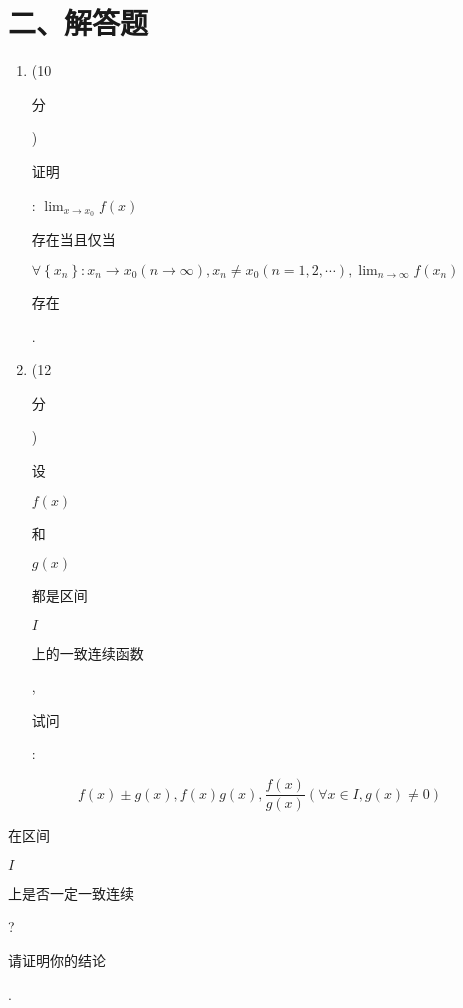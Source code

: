 \documentclass[10pt]{article}
\begin{document}
\section{二、解答题}
\begin{enumerate}
  \item (10 \begin{CJK}{UTF8}{mj}分\end{CJK}) \begin{CJK}{UTF8}{mj}证明\end{CJK}: $\lim _{x \rightarrow x_{0}} f(x)$ \begin{CJK}{UTF8}{mj}存在当且仅当\end{CJK} $\forall\left\{x_{n}\right\}: x_{n} \rightarrow x_{0}(n \rightarrow \infty), x_{n} \neq x_{0}(n=1,2, \cdots), \lim _{n \rightarrow \infty} f\left(x_{n}\right)$ \begin{CJK}{UTF8}{mj}存在\end{CJK}.

  \item (12 \begin{CJK}{UTF8}{mj}分\end{CJK}) \begin{CJK}{UTF8}{mj}设\end{CJK} $f(x)$ \begin{CJK}{UTF8}{mj}和\end{CJK} $g(x)$ \begin{CJK}{UTF8}{mj}都是区间\end{CJK} $I$ \begin{CJK}{UTF8}{mj}上的一致连续函数\end{CJK}, \begin{CJK}{UTF8}{mj}试问\end{CJK}:

\end{enumerate}
$$
f(x) \pm g(x), f(x) g(x), \frac{f(x)}{g(x)}(\forall x \in I, g(x) \neq 0)
$$
\begin{CJK}{UTF8}{mj}在区间\end{CJK} $I$ \begin{CJK}{UTF8}{mj}上是否一定一致连续\end{CJK}? \begin{CJK}{UTF8}{mj}请证明你的结论\end{CJK}.
\end{document}
